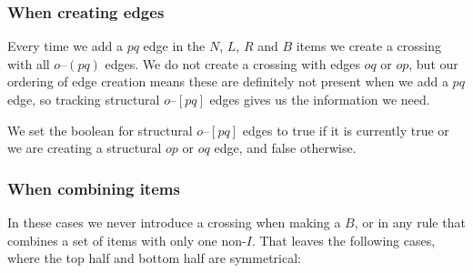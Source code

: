 \subsubsection{When creating edges}
Every time we add a $pq$ edge in the $N$, $L$, $R$ and $B$ items we create a crossing with all $o$--$(pq)$ edges.
We do not create a crossing with edges $oq$ or $op$, but our ordering of edge creation means these are definitely not present when we add a $pq$ edge, so tracking structural $o$--$[pq]$ edges gives us the information we need.

We set the boolean for structural $o$--$[pq]$ edges to true if it is currently true or we are creating a structural $op$ or $oq$ edge, and false otherwise.

\subsubsection{When combining items}
In these cases we never introduce a crossing when making a $B$, or in any rule that combines a set of items with only one non-$I$.
That leaves the following cases, where the top half and bottom half are symmetrical:


